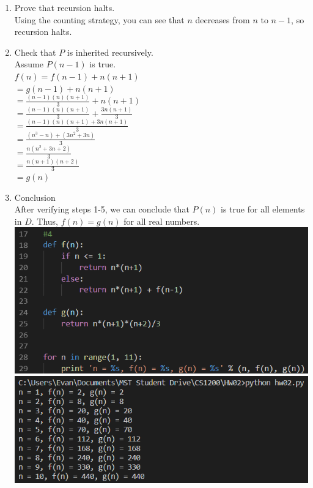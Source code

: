 \documentclass{article}
\begin{document}
\begin{enumerate}
\begin{enumerate}[1.]
        \item Prove that recursion halts.\\
        Using the counting strategy, you can see that $n$ decreases 
        from $n$ to $n-1$, so recursion halts.
        \item Check that $P$ is inherited recursively.\\
        Assume $P(n-1)$ is true.\\
        $f(n) = f(n-1) + n(n+1)$\\
        $=g(n-1) + n(n+1)$\\
        $=\frac{(n-1)(n)(n+1)}{3} + n(n+1)$\\
        $=\frac{(n-1)(n)(n+1)}{3} + \frac{3n(n+1)}{3}$\\
        $=\frac{(n-1)(n)(n+1) + 3n(n+1)}{3}$\\
        $=\frac{(n^{3}-n)+(3n^{2}+3n)}{3}$\\
        $=\frac{n(n^{2}+3n+2)}{3}$\\
        $=\frac{n(n+1)(n+2)}{3}$\\
        $=g(n)$
        \item Conclusion\\
        After verifying steps 1-5, we can conclude that $P(n)$ is true for 
        all elements in $D$. Thus, $f(n) = g(n)$ for all real numbers.\\
        \includegraphics[scale=.8]{4a}\\
        \includegraphics[scale=.8]{4b}


\end{enumerate}
\end{enumerate}
\end{document}
